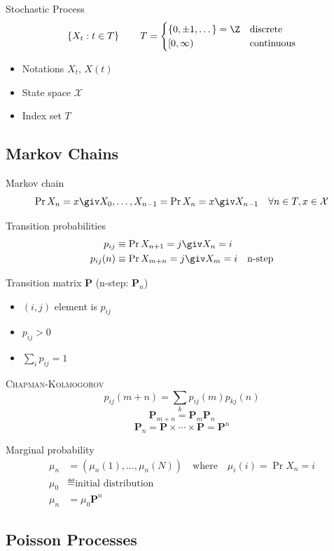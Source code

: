 \documentclass[landscape]{article}
\begin{document}
\begin{multicols*}{2}
Stochastic Process
\[\left\{ X_t : t \in T\right\} \qquad T=\begin{cases}\{0,\pm1,\dots\}=\Z &
  \text{discrete} \\ [0,\infty) & \text{continuous}\end{cases}\]

\begin{itemize}
  \item Notations $X_t$, $X(t)$
  \item State space $\mathcal{X}$
  \item Index set $T$
\end{itemize}

\subsection{Markov Chains}

Markov chain
\[\Pr{X_n = x \giv X_0,\dots,X_{n-1}} = \Pr{X_n = x \giv X_{n-1}}
\quad \forall n\in T, x \in \mathcal{X}\]

Transition probabilities
\begin{align*}
p_{ij} &\equiv \Pr{X_{n+1} = j \giv X_n = i} \\
p_{ij}(n) &\equiv \Pr{X_{m+n} = j \giv X_m = i} \quad\text{n-step}
\end{align*}

Transition matrix $\mathbf{P}$ (n-step: $\mathbf{P}_n$)
\begin{itemize}
  \item $(i,j)$ element is $p_{ij}$
  \item $p_{ij} > 0$
  \item $\sum_i p_{ij} = 1$
\end{itemize}

\textsc{Chapman-Kolmogorov}
\[p_{ij}(m+n) = \sum_k p_{ij}(m) p_{kj}(n)\]
\[\mathbf{P}_{m+n} = \mathbf{P}_m\mathbf{P}_n\]
\[\mathbf{P}_n = \mathbf{P} \times \cdots \times \mathbf{P} = \mathbf{P}^n\]

Marginal probability
\begin{align*}
  \mu_n &= (\mu_n(1),\dots,\mu_n(N))
  \quad\text{where}\quad \mu_i(i)=\Pr{X_n=i} \\
\mu_0 &\eqdef \text{initial distribution} \\
\mu_n &= \mu_0\mathbf{P}^n
\end{align*}

\subsection{Poisson Processes}


\end{multicols*}
\end{document}
